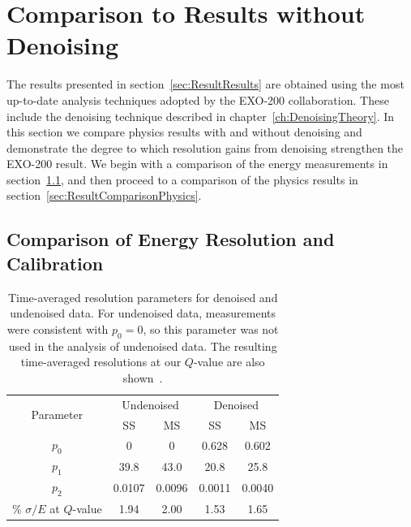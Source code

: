 \section{Comparison to Results without Denoising}\label{sec:ResultComparison}

The results presented in section~\ref{sec:ResultResults} are obtained using the most up-to-date analysis techniques adopted by the EXO-200 collaboration.  These include the denoising technique described in chapter~\ref{ch:DenoisingTheory}.  In this section we compare physics results with and without denoising and demonstrate the degree to which resolution gains from denoising strengthen the EXO-200 result.  We begin with a comparison of the energy measurements in section~\ref{sec:ResultComparisonEnergy}, and then proceed to a comparison of the physics results in section~\ref{sec:ResultComparisonPhysics}.

\subsection{Comparison of Energy Resolution and Calibration}\label{sec:ResultComparisonEnergy}

\begin{table}
\begin{center}
\begin{tabular}{|c|c|c|c|c|}
\hline \multirow{2}{*}{Parameter} & \multicolumn{2}{|c|}{Undenoised} & \multicolumn{2}{|c|}{Denoised}\\
\cline{2-5}& SS & MS & SS & MS \\
\hline $p_0$ & 0 & 0 & 0.628 & 0.602 \\
\hline $p_1$ & 39.8 & 43.0 & 20.8 & 25.8 \\
\hline $p_2$ & 0.0107 & 0.0096 & 0.0011 & 0.0040 \\
\hline \% $\sigma/E$ at $Q$-value & 1.94 & 2.00 & 1.53 & 1.65 \\ \hline
\end{tabular}
\end{center}
\caption{Time-averaged resolution parameters for denoised and undenoised data.  For undenoised data, measurements were consistent with $p_0 = 0$, so this parameter was not used in the analysis of undenoised data.  The resulting time-averaged resolutions at our $Q$-value are also shown~\cite{AverageEnergyResolutionDocument}.}
\label{tab:ResolutionFunctions_DenoisedUndenoisedComparison}
\end{table}

